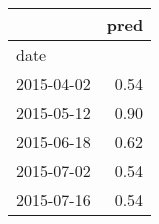 \begin{tabular}{lr}
\toprule
{} &  pred \\
\midrule
date       &       \\
2015-04-02 &  0.54 \\
2015-05-12 &  0.90 \\
2015-06-18 &  0.62 \\
2015-07-02 &  0.54 \\
2015-07-16 &  0.54 \\
\bottomrule
\end{tabular}
